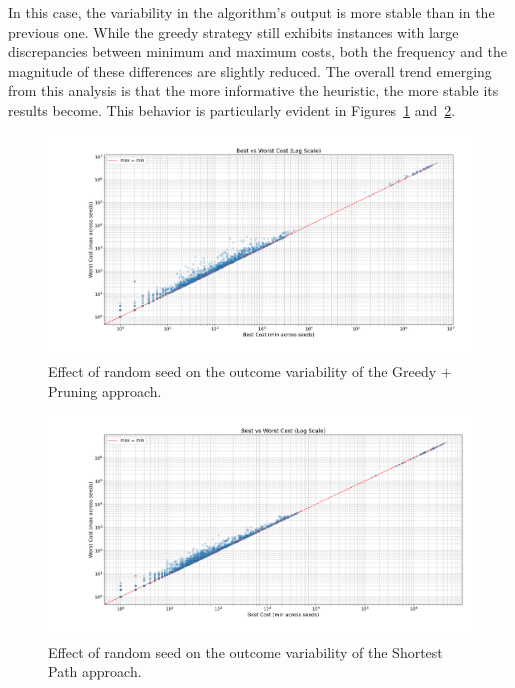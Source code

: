 In this case, the variability in the algorithm's output is more stable than in the previous one. While the greedy strategy still
exhibits instances with large discrepancies between minimum and maximum costs, both the frequency and the magnitude of these
differences are slightly reduced.
The overall trend emerging from this analysis is that the more informative the heuristic, the more stable its results become.
This behavior is particularly evident in Figures~\ref{fig:rand_pruning} and~\ref{fig:rand_sp}.

\begin{figure}[h!]
	\centering
	\includegraphics[width=\textwidth]{images/randomization_pruning.png}
	\caption{Effect of random seed on the outcome variability of the Greedy + Pruning approach.}
	\label{fig:rand_pruning}
\end{figure}

\begin{figure}[h!]
	\centering
	\includegraphics[width=\textwidth]{images/randomization_sp.png}
	\caption{Effect of random seed on the outcome variability of the Shortest Path approach.}
	\label{fig:rand_sp}
\end{figure}

